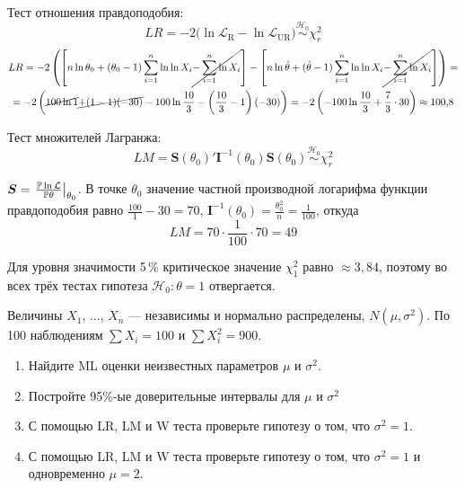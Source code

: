 \documentclass[pdftex,11pt,openany]{book}\usepackage[]{graphicx}\usepackage[]{color}
\newcommand{\calL}{\mathcal{L}}
\newcommand{\bs}[1]{\boldsymbol{#1}}
\newcommand{\hypo}{\mathcal{H}}
\newcommand{\simhypo}{\ensuremath{\mathrel{\stackrel{\hypo_0}{\sim}}}}
\begin{document}
\begin{solution}
Тест отношения правдоподобия:
\[
LR = -2 \bigl( \ln \calL_{\text{R}} - \ln \calL_{\text{UR}} \bigr) \simhypo \chi^2_r
\]
\begin{multline*}
LR = -2 \left( \left[n \ln \theta_0 + (\theta_0-1) \sum\limits_{i=1}^{n} \ln \ln X_i \cancel{- \sum\limits_{i=1}^{n} \ln X_i}\right] - \left[n \ln \hat\theta + (\hat\theta-1) \sum\limits_{i=1}^{n} \ln \ln X_i \cancel{- \sum\limits_{i=1}^{n} \ln X_i}\right] \right) = \\
= -2 \left( \cancel{100 \ln 1} \cancel{+ (1-1) (-30)}  - 100 \ln \frac{10}{3} - \left(\frac{10}{3}-1 \right) (-30)  \right) = -2 \left( - 100 \ln \frac{10}{3} + \frac73 \cdot 30  \right) \approx 100{,}8
\end{multline*}

Тест множителей Лагранжа:
\[
LM = \bs{S}({\theta}_0)' \bs{I}^{-1}({\theta}_{0}) \bs{S}({\theta}_{0}) \simhypo \chi^2_r
\]

$\bs{S} = \left.\frac{\p \ln \calL}{\p \theta}\right|_{\theta_0}$. В точке $\theta_0$ значение частной производной логарифма функции правдоподобия равно $\frac{100}{1} -30=70$, $\bs{I}^{-1}(\theta_0) = \frac{\theta^2_0}{n} = \frac{1}{100}$, откуда
\[
LM = 70\cdot \frac{1}{100} \cdot 70 = 49
\]

Для уровня значимости 5\,\% критическое значение $\chi^2_1$ равно $\approx3{,}84$, поэтому во всех трёх тестах гипотеза $\hypo_0\colon \theta=1$ отвергается.

\end{solution}


\begin{problem}
 Величины $X_{1}$, ..., $X_{n}$ --- независимы и нормально распределены, $N(\mu,\sigma^2)$. По 100 наблюдениям $\sum X_i=100$ и  $\sum X_i^2=900$. 
\begin{enumerate}
\item Найдите ML оценки неизвестных параметров $\mu$ и $\sigma^2$.
\item Постройте 95\%-ые доверительные интервалы для $\mu$ и $\sigma^2$
\item С помощью LR, LM и W теста проверьте гипотезу о том, что $\sigma^2=1$.
\item С помощью LR, LM и W теста проверьте гипотезу о том, что $\sigma^2=1$ и одновременно $\mu=2$.
\end{enumerate}
\end{problem}
\end{document}

